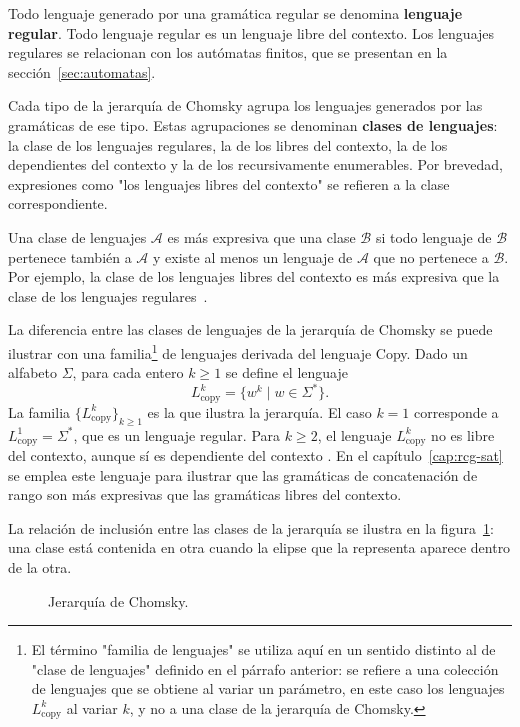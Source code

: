 Todo lenguaje generado por una gramática regular se denomina
\textbf{lenguaje regular}. Todo lenguaje regular es un lenguaje libre
del contexto. Los lenguajes regulares se relacionan con los autómatas
finitos, que se presentan en la sección~\ref{sec:automatas}.

Cada tipo de la jerarquía de Chomsky agrupa los lenguajes generados
por las gramáticas de ese tipo. Estas agrupaciones se denominan
\textbf{clases de lenguajes}: la clase de los lenguajes regulares, la
de los libres del contexto, la de los dependientes del contexto y la
de los recursivamente enumerables. Por brevedad, expresiones como "los
lenguajes libres del contexto" se refieren a la clase correspondiente.

Una clase de lenguajes $\mathcal{A}$ es más expresiva que una clase
$\mathcal{B}$ si todo lenguaje de $\mathcal{B}$ pertenece también a
$\mathcal{A}$ y existe al menos un lenguaje de $\mathcal{A}$ que no
pertenece a $\mathcal{B}$. Por ejemplo, la clase de los lenguajes
libres del contexto es más expresiva que la clase de los lenguajes
regulares~\cite{hopcroft2006introduction}.

La diferencia entre las clases de lenguajes de la jerarquía de Chomsky
se puede ilustrar con una familia\footnote{El término "familia de
lenguajes" se utiliza aquí en un sentido distinto al de "clase de
lenguajes" definido en el párrafo anterior: se refiere a una colección
de lenguajes que se obtiene al variar un parámetro, en este caso
los lenguajes $L_{\mathrm{copy}}^k$ al variar $k$, y no a una clase
de la jerarquía de Chomsky.} de lenguajes derivada del lenguaje Copy.
Dado un alfabeto $\Sigma$, para cada entero $k \ge 1$ se define el
lenguaje
\[
  L_{\mathrm{copy}}^k = \{ w^k \mid w \in \Sigma^* \}.
\]
La familia $\{L_{\mathrm{copy}}^k\}_{k \ge 1}$ es la que ilustra la
jerarquía.
El caso $k = 1$ corresponde a $L_{\mathrm{copy}}^1 = \Sigma^*$, que es
un lenguaje regular. Para $k \ge 2$, el lenguaje $L_{\mathrm{copy}}^k$
no es libre del contexto, aunque sí es dependiente del contexto
\cite{hopcroft2006introduction}. En el capítulo~\ref{cap:rcg-sat} se
emplea este lenguaje para ilustrar que las gramáticas de concatenación
de rango son más expresivas que las gramáticas libres del contexto.

La relación de inclusión entre las clases de la jerarquía se ilustra
en la figura~\ref{fig:chomsky}: una clase está contenida en otra
cuando la elipse que la representa aparece dentro de la otra.

\begin{figure}[H]
\centering
{}
\caption{Jerarquía de Chomsky.}
\label{fig:chomsky}
\end{figure}

